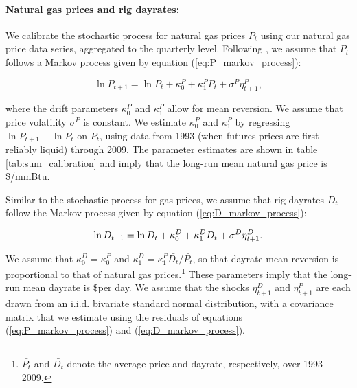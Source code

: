 \documentclass[12pt]{article}
\begin{document}
\paragraph{Natural gas prices and rig dayrates:}

We calibrate the stochastic process for natural gas prices $P_t$ using our natural gas price data series, aggregated to the quarterly level. Following \citet{bib:kellogg}, we assume that $P_t$ follows a Markov process given by equation (\ref{eq:P_markov_process}):

\begin{equation}
\ln P_{t+1} = \ln P_t + \kappa^P_0 + \kappa^P_1 P_t + \sigma^P \eta^P_{t+1},
\label{eq:P_markov_process}
\end{equation}

\noindent where the drift parameters $\kappa^P_0$ and $\kappa^P_1$ allow for mean reversion. We assume that price volatility $\sigma^P$ is constant. We estimate $\kappa^P_0$ and $\kappa^P_1$ by regressing $\ln P_{t+1} - \ln P_t$ on $P_t$, using data from 1993 (when futures prices are first reliably liquid) through 2009. The parameter estimates are shown in table \ref{tab:sum_calibration} and imply that the long-run mean natural gas price is \$\unskip /mmBtu.

Similar to the stochastic process for gas prices, we assume that rig dayrates $D_t$ follow the Markov process given by equation (\ref{eq:D_markov_process}):

\begin{equation}
\ln D_{t+1} = \ln D_t + \kappa^D_0 + \kappa^D_1 D_t + \sigma^D \eta^D_{t+1}.
\label{eq:D_markov_process} \\
\end{equation}

We assume that $\kappa^D_0 = \kappa^P_0$ and $\kappa^D_1 = \kappa^P_1\bar{D_t}/\bar{P_t}$, so that dayrate mean reversion is proportional to that of natural gas prices.\footnote{$\bar{P_t}$ and $\bar{D_t}$ denote the average price and dayrate, respectively, over 1993--2009.} These parameters imply that the long-run mean dayrate is \$per day. We assume that the shocks $\eta^D_{t+1}$ and $\eta^P_{t+1}$ are each drawn from an i.i.d. bivariate standard normal distribution, with a covariance matrix that we estimate using the residuals of equations (\ref{eq:P_markov_process}) and (\ref{eq:D_markov_process}).
\end{document}
